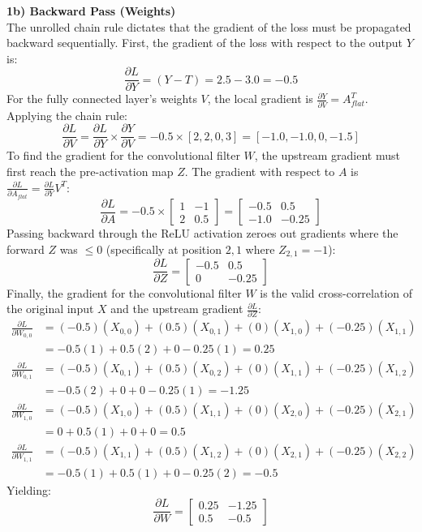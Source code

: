 \documentclass[12pt,a4paper]{article}
\begin{document}
\textbf{1b) Backward Pass (Weights)}\\
The unrolled chain rule dictates that the gradient of the loss must be propagated backward sequentially. First, the gradient of the loss with respect to the output $Y$ is:
\[ \frac{\partial L}{\partial Y} = (Y - T) = 2.5 - 3.0 = -0.5 \]
For the fully connected layer's weights $V$, the local gradient is $\frac{\partial Y}{\partial V} = A_{flat}^T$. Applying the chain rule:
\[ \frac{\partial L}{\partial V} = \frac{\partial L}{\partial Y} \times \frac{\partial Y}{\partial V} = -0.5 \times [2, 2, 0, 3] = [-1.0, -1.0, 0, -1.5] \]
To find the gradient for the convolutional filter $W$, the upstream gradient must first reach the pre-activation map $Z$. The gradient with respect to $A$ is $\frac{\partial L}{\partial A_{flat}} = \frac{\partial L}{\partial Y} V^T$:
\[ \frac{\partial L}{\partial A} = -0.5 \times \begin{bmatrix} 1 & -1 \\ 2 & 0.5 \end{bmatrix} = \begin{bmatrix} -0.5 & 0.5 \\ -1.0 & -0.25 \end{bmatrix} \]
Passing backward through the ReLU activation zeroes out gradients where the forward $Z$ was $\le 0$ (specifically at position $2,1$ where $Z_{2,1} = -1$):
\[ \frac{\partial L}{\partial Z} = \begin{bmatrix} -0.5 & 0.5 \\ 0 & -0.25 \end{bmatrix} \]
Finally, the gradient for the convolutional filter $W$ is the valid cross-correlation of the original input $X$ and the upstream gradient $\frac{\partial L}{\partial Z}$:
\begin{align*}
    \frac{\partial L}{\partial W_{0,0}} &= (-0.5)(X_{0,0}) + (0.5)(X_{0,1}) + (0)(X_{1,0}) + (-0.25)(X_{1,1}) \\
                                        &= -0.5(1) + 0.5(2) + 0 - 0.25(1) = 0.25 \\
    \frac{\partial L}{\partial W_{0,1}} &= (-0.5)(X_{0,1}) + (0.5)(X_{0,2}) + (0)(X_{1,1}) + (-0.25)(X_{1,2}) \\
                                        &= -0.5(2) + 0 + 0 - 0.25(1) = -1.25 \\
    \frac{\partial L}{\partial W_{1,0}} &= (-0.5)(X_{1,0}) + (0.5)(X_{1,1}) + (0)(X_{2,0}) + (-0.25)(X_{2,1}) \\
                                        &= 0 + 0.5(1) + 0 + 0 = 0.5 \\
    \frac{\partial L}{\partial W_{1,1}} &= (-0.5)(X_{1,1}) + (0.5)(X_{1,2}) + (0)(X_{2,1}) + (-0.25)(X_{2,2}) \\
                                        &= -0.5(1) + 0.5(1) + 0 - 0.25(2) = -0.5
\end{align*}
Yielding:
\[ \frac{\partial L}{\partial W} = \begin{bmatrix} 0.25 & -1.25 \\ 0.5 & -0.5 \end{bmatrix} \]
\end{document}
